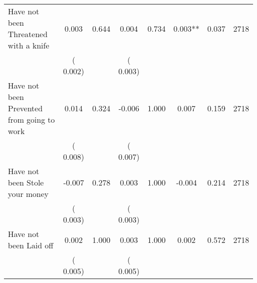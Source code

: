 \begin{tabular}{l*{7}{c}}
 Have not been Threatened with a knife       &              0.003       &        0.644  &              0.004       &        0.734  &              0.003**       &              0.037 &  2718 \\ 
                       &       (       0.002)             &                               &       (       0.003)                     &                               &                                               &                                &                      \\ 

 Have not been Prevented from going to work       &              0.014       &        0.324  &             -0.006       &        1.000  &              0.007       &              0.159 &  2718 \\ 
                       &       (       0.008)             &                               &       (       0.007)                     &                               &                                               &                                &                      \\ 

 Have not been Stole your money       &             -0.007       &        0.278  &              0.003       &        1.000  &             -0.004       &              0.214 &  2718 \\ 
                       &       (       0.003)             &                               &       (       0.003)                     &                               &                                               &                                &                      \\ 

 Have not been Laid off       &              0.002       &        1.000  &              0.003       &        1.000  &              0.002       &              0.572 &  2718 \\ 
                       &       (       0.005)             &                               &       (       0.005)                     &                               &                                               &                                &                      \\ 

\hline \end{tabular}